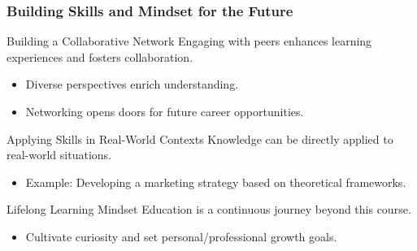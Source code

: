 \documentclass[aspectratio=169]{beamer}
\begin{document}
\begin{frame}[fragile]
    \frametitle{Building Skills and Mindset for the Future}
    \begin{block}{Building a Collaborative Network}
        Engaging with peers enhances learning experiences and fosters collaboration.
    \end{block}
    \begin{itemize}
        \item Diverse perspectives enrich understanding.
        \item Networking opens doors for future career opportunities.
    \end{itemize}
    
    \begin{block}{Applying Skills in Real-World Contexts}
        Knowledge can be directly applied to real-world situations.
    \end{block}
    \begin{itemize}
        \item Example: Developing a marketing strategy based on theoretical frameworks.
    \end{itemize}

    \begin{block}{Lifelong Learning Mindset}
        Education is a continuous journey beyond this course.
    \end{block}
    \begin{itemize}
        \item Cultivate curiosity and set personal/professional growth goals.
    \end{itemize}
\end{frame}
\end{document}
